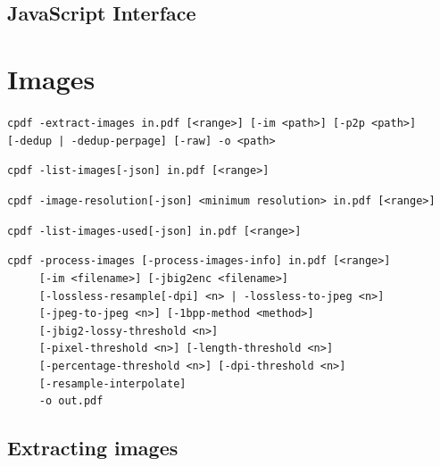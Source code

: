 \documentclass{book}
\begin{document}
\begin{jscpdflib}
\clearpage
\section*{JavaScript Interface}
\begin{small}\tt

\end{small}
\end{jscpdflib}

\chapter{Images}\label{chap:13}
\begin{framed}
\noindent\small\verb!cpdf -extract-images in.pdf [<range>] [-im <path>] [-p2p <path>]!
\noindent\small\verb!     [-dedup | -dedup-perpage] [-raw] -o <path>!

\vspace{1.5mm}
\noindent\small\verb!cpdf -list-images[-json] in.pdf [<range>]!

\vspace{1.5mm}
\noindent\small\verb!cpdf -image-resolution[-json] <minimum resolution> in.pdf [<range>]!

\vspace{1.5mm}
\noindent\small\verb!cpdf -list-images-used[-json] in.pdf [<range>]!

\vspace{1.5mm}
\noindent\small\verb!cpdf -process-images [-process-images-info] in.pdf [<range>]!\\
\noindent\small\verb!     [-im <filename>] [-jbig2enc <filename>]!\\
\noindent\small\verb!     [-lossless-resample[-dpi] <n> | -lossless-to-jpeg <n>]!\\
\noindent\small\verb!     [-jpeg-to-jpeg <n>] [-1bpp-method <method>]!\\
\noindent\small\verb!     [-jbig2-lossy-threshold <n>]!\\
\noindent\small\verb!     [-pixel-threshold <n>] [-length-threshold <n>]!\\
\noindent\small\verb!     [-percentage-threshold <n>] [-dpi-threshold <n>]!\\
\noindent\small\verb!     [-resample-interpolate]!\\
\noindent\small\verb!     -o out.pdf!


\end{framed}

\section{Extracting images}
\end{document}
